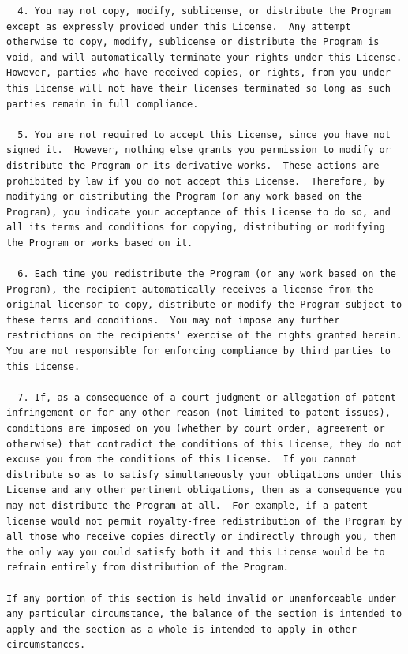 \documentclass[a4paper,BCOR30mm,DIV14,pdftex,liststotoc,footsepline,openany]{scrbook}
\begin{document}
\begin{verbatim}
  4. You may not copy, modify, sublicense, or distribute the Program
except as expressly provided under this License.  Any attempt
otherwise to copy, modify, sublicense or distribute the Program is
void, and will automatically terminate your rights under this License.
However, parties who have received copies, or rights, from you under
this License will not have their licenses terminated so long as such
parties remain in full compliance.

  5. You are not required to accept this License, since you have not
signed it.  However, nothing else grants you permission to modify or
distribute the Program or its derivative works.  These actions are
prohibited by law if you do not accept this License.  Therefore, by
modifying or distributing the Program (or any work based on the
Program), you indicate your acceptance of this License to do so, and
all its terms and conditions for copying, distributing or modifying
the Program or works based on it.

  6. Each time you redistribute the Program (or any work based on the
Program), the recipient automatically receives a license from the
original licensor to copy, distribute or modify the Program subject to
these terms and conditions.  You may not impose any further
restrictions on the recipients' exercise of the rights granted herein.
You are not responsible for enforcing compliance by third parties to
this License.

  7. If, as a consequence of a court judgment or allegation of patent
infringement or for any other reason (not limited to patent issues),
conditions are imposed on you (whether by court order, agreement or
otherwise) that contradict the conditions of this License, they do not
excuse you from the conditions of this License.  If you cannot
distribute so as to satisfy simultaneously your obligations under this
License and any other pertinent obligations, then as a consequence you
may not distribute the Program at all.  For example, if a patent
license would not permit royalty-free redistribution of the Program by
all those who receive copies directly or indirectly through you, then
the only way you could satisfy both it and this License would be to
refrain entirely from distribution of the Program.

If any portion of this section is held invalid or unenforceable under
any particular circumstance, the balance of the section is intended to
apply and the section as a whole is intended to apply in other
circumstances.


\end{verbatim}
\end{document}
